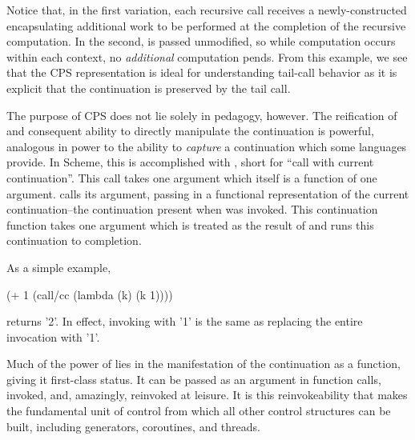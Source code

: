 \documentclass[ms,electronic,twosidetoc,letterpaper,chaptercenter,parttop]{byumsphd}
\begin{document}
Notice that, in the first variation, each recursive call receives a newly-constructed
 encapsulating additional work to be performed at the completion of the
recursive computation. In the second,  is passed unmodified, so while
computation occurs within each context, no \emph{additional} computation pends. From this
example, we see that the CPS representation is ideal for understanding tail-call behavior
as it is explicit that the continuation is preserved by the tail call.

The purpose of CPS does not lie solely in pedagogy, however. The reification of and
consequent ability to directly manipulate the continuation is powerful, analogous in power
to the ability to \emph{capture} a continuation which some languages provide. In Scheme,
this is accomplished with , short for ``call with current continuation''.
This call takes one argument which itself is a function of one argument. 
calls its argument, passing in a functional representation of the current
continuation--the continuation present when  was invoked. This
continuation function takes one argument which is treated as the result of
 and runs this continuation to completion.

As a simple example,
\begin{schemedisplay}
(+ 1 (call/cc
       (lambda (k)
         (k 1))))
\end{schemedisplay}
returns \scheme'2'. In effect, invoking  with \scheme'1' is the same 
as replacing the entire  invocation with \scheme'1'.

Much of the power of  lies in the manifestation of the continuation as a
function, giving it first-class status. It can be passed as an argument in function calls,
invoked, and, amazingly, reinvoked at leisure. It is this reinvokeability that makes
 the fundamental unit of control from which all other control structures can
be built, including generators, coroutines, and threads.

\end{document}
